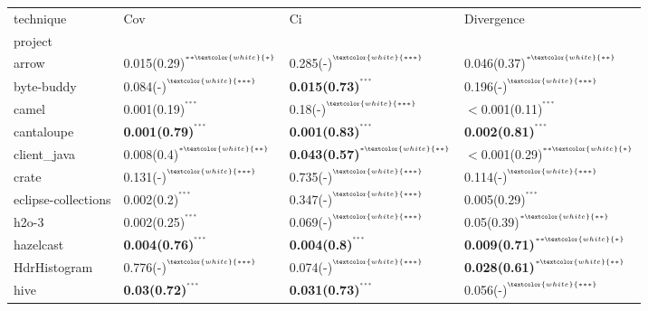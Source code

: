 \begin{tabular}{llll}
\toprule
technique &                                                        Cov &                                                            Ci &                                                 Divergence \\
project             &                                                            &                                                               &                                                            \\
\midrule
arrow               &  0.015(0.29)\tiny{$^{^{**\textcolor{white}{*}}}$} &  0.285(-)\tiny{$^{^{\textcolor{white}{***}}}$} &  0.046(0.37)\tiny{$^{^{*\textcolor{white}{**}}}$} \\
byte-buddy          &  0.084(-)\tiny{$^{^{\textcolor{white}{***}}}$} &  \textbf{0.015(0.73)}\tiny{$^{^{***}}$} &  0.196(-)\tiny{$^{^{\textcolor{white}{***}}}$} \\
camel               &  0.001(0.19)\tiny{$^{^{***}}$} &  0.18(-)\tiny{$^{^{\textcolor{white}{***}}}$} &  $<$0.001(0.11)\tiny{$^{^{***}}$} \\
cantaloupe          &  \textbf{0.001(0.79)}\tiny{$^{^{***}}$} &  \textbf{0.001(0.83)}\tiny{$^{^{***}}$} &  \textbf{0.002(0.81)}\tiny{$^{^{***}}$} \\
client_java         &  0.008(0.4)\tiny{$^{^{*\textcolor{white}{**}}}$} &  \textbf{0.043(0.57)}\tiny{$^{^{*\textcolor{white}{**}}}$} &  $<$0.001(0.29)\tiny{$^{^{**\textcolor{white}{*}}}$} \\
crate               &  0.131(-)\tiny{$^{^{\textcolor{white}{***}}}$} &  0.735(-)\tiny{$^{^{\textcolor{white}{***}}}$} &  0.114(-)\tiny{$^{^{\textcolor{white}{***}}}$} \\
eclipse-collections &  0.002(0.2)\tiny{$^{^{***}}$} &  0.347(-)\tiny{$^{^{\textcolor{white}{***}}}$} &  0.005(0.29)\tiny{$^{^{***}}$} \\
h2o-3               &  0.002(0.25)\tiny{$^{^{***}}$} &  0.069(-)\tiny{$^{^{\textcolor{white}{***}}}$} &  0.05(0.39)\tiny{$^{^{*\textcolor{white}{**}}}$} \\
hazelcast           &  \textbf{0.004(0.76)}\tiny{$^{^{***}}$} &  \textbf{0.004(0.8)}\tiny{$^{^{***}}$} &  \textbf{0.009(0.71)}\tiny{$^{^{**\textcolor{white}{*}}}$} \\
HdrHistogram        &  0.776(-)\tiny{$^{^{\textcolor{white}{***}}}$} &  0.074(-)\tiny{$^{^{\textcolor{white}{***}}}$} &  \textbf{0.028(0.61)}\tiny{$^{^{*\textcolor{white}{**}}}$} \\
hive                &  \textbf{0.03(0.72)}\tiny{$^{^{***}}$} &  \textbf{0.031(0.73)}\tiny{$^{^{***}}$} &  0.056(-)\tiny{$^{^{\textcolor{white}{***}}}$} \\

\end{tabular}
